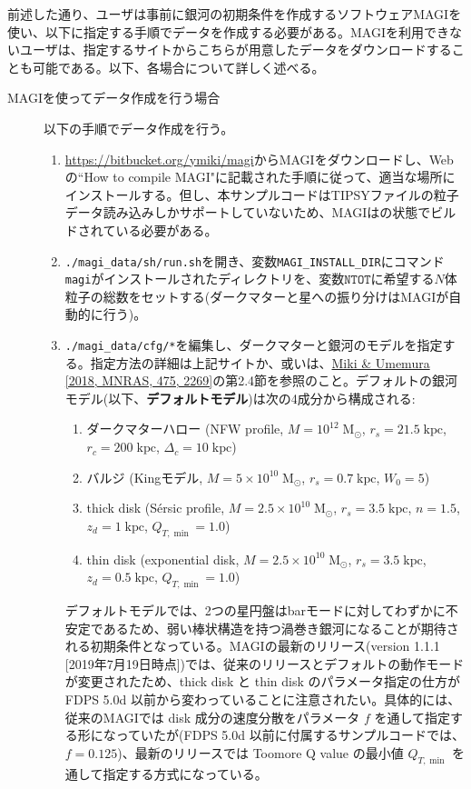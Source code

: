 \label{s3sec:NbodySPH_MAGI_usage}
前述した通り、ユーザは事前に銀河の初期条件を作成するソフトウェア\textsc{MAGI}を使い、以下に指定する手順でデータを作成する必要がある。\textsc{MAGI}を利用できないユーザは、指定するサイトからこちらが用意したデータをダウンロードすることも可能である。以下、各場合について詳しく述べる。
\begin{description}
\item[\textsc{MAGI}を使ってデータ作成を行う場合] 以下の手順でデータ作成を行う。
\begin{enumerate}
\item \href{https://bitbucket.org/ymiki/magi}{https://bitbucket.org{\slash}ymiki{\slash}magi}から\textsc{MAGI}をダウンロードし、Webの``How to compile MAGI"に記載された手順に従って、適当な場所にインストールする。但し、本サンプルコードはTIPSYファイルの粒子データ読み込みしかサポートしていないため、MAGIはの状態でビルドされている必要がある。
\item \texttt{./magi\_data/sh/run.sh}を開き、変数\texttt{MAGI\_INSTALL\_DIR}にコマンド\texttt{magi}がインストールされたディレクトリを、変数$\texttt{NTOT}$に希望する$N$体粒子の総数をセットする(ダークマターと星への振り分けは\textsc{MAGI}が自動的に行う)。
\item \texttt{./magi\_data/cfg/*}を編集し、ダークマターと銀河のモデルを指定する。指定方法の詳細は上記サイトか、或いは、\href{https://doi.org/10.1093/mnras/stx3327}{Miki \& Umemura [2018, MNRAS, 475, 2269]}の第2.4節を参照のこと。デフォルトの銀河モデル(以下、\textbf{デフォルトモデル})は次の4成分から構成される:
\begin{enumerate}[label=(\roman*)]
\item ダークマターハロー (NFW profile, $M=10^{12}\;\mathrm{M_{\odot}}$, $r_{s}=21.5\;\mathrm{kpc}$, $r_{c}=200\;\mathrm{kpc}$, $\Delta_{c}=10\;\mathrm{kpc}$)
\item バルジ (Kingモデル, $M=5\times 10^{10}\;\mathrm{M_{\odot}}$, $r_{s}=0.7\;\mathrm{kpc}$, $W_{0}=5$)
\item thick disk  (S{\'e}rsic profile, $M=2.5\times 10^{10}\;\mathrm{M_{\odot}}$, $r_{s}=3.5\;\mathrm{kpc}$, $n=1.5$, $z_{d}=1\;\mathrm{kpc}$, $Q_{T,\min}=1.0$)
\item thin disk (exponential disk, $M=2.5\times 10^{10}\;\mathrm{M_{\odot}}$, $r_{s}=3.5\;\mathrm{kpc}$, $z_{d}=0.5\;\mathrm{kpc}$, $Q_{T,\min}=1.0$)
\end{enumerate}
デフォルトモデルでは、2つの星円盤はbarモードに対してわずかに不安定であるため、弱い棒状構造を持つ渦巻き銀河になることが期待される初期条件となっている。\textsc{MAGI}の最新のリリース(version 1.1.1 [2019年7月19日時点])では、従来のリリースとデフォルトの動作モードが変更されたため、thick disk と thin disk のパラメータ指定の仕方が FDPS 5.0d 以前から変わっていることに注意されたい。具体的には、従来の\textsc{MAGI}では disk 成分の速度分散をパラメータ $f$ を通して指定する形になっていたが(FDPS 5.0d 以前に付属するサンプルコードでは、$f=0.125$)、最新のリリースでは Toomore Q value の最小値 $Q_{T,\min}$ を通して指定する方式になっている。

\end{enumerate}
\end{description}
